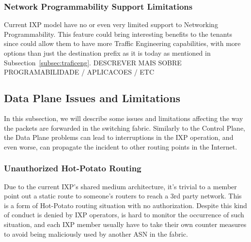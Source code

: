 \documentclass[12pt]{article}
\begin{document}
\subsubsection{Network Programmability Support Limitations}

Current IXP model have no or even very limited support to Networking Programmability. This feature could bring interesting benefits to the tenants since could allow them to have more Traffic Engineering capabilities, with more options than just the destination prefix as it is today as mentioned in Subsection~\ref{subsec:traficeng}.
DESCREVER MAIS SOBRE PROGRAMABILIDADE / APLICACOES / ETC

\subsection{Data Plane Issues and Limitations}
In this subsection, we will describe some issues and limitations affecting the way the packets are forwarded in the switching fabric. Similarly to the Control Plane, the Data Plane problems can lead to interruptions in the IXP operation, and even worse, can propagate the incident to other routing points in the Internet.

\subsubsection{Unauthorized Hot-Potato Routing}

Due to the current IXP's shared medium architecture, it's trivial to a member point out a static route to someone's routers to reach a 3rd party network. This is a form of Hot-Potato routing situation with no authorization. Despite this kind of conduct is denied by IXP operators, is hard to monitor the occurrence of such situation, and each IXP member usually have to take their own counter measures to avoid being maliciously used by another ASN in the fabric.
\end{document}
